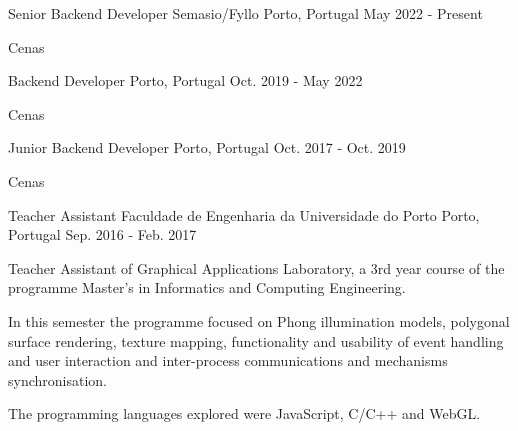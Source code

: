 \begin{cventries}
	\cventry
	{Senior Backend Developer} %
	{Semasio/Fyllo} %
	{Porto, Portugal} %
	{May 2022 - Present} %
	{
		\begin{cvitems} %
			\item {
				Cenas
			}
		\end{cvitems}
	}
	
	\cventry
	{Backend Developer} %
	{} %
	{Porto, Portugal} %
	{Oct. 2019 - May 2022} %
	{
		\begin{cvitems} %
			\item {
				Cenas
			}
		\end{cvitems}
	}
	
    \cventry
    {Junior Backend Developer} %
    {} %
    {Porto, Portugal} %
    {Oct. 2017 - Oct. 2019} %
    {
		\begin{cvitems} %
			\item {
				Cenas
			}
		\end{cvitems}
    }


   \cventry
    {Teacher Assistant} %
    {Faculdade de Engenharia da Universidade do Porto} %
    {Porto, Portugal} %
    {Sep. 2016 - Feb. 2017} %
    {
      \begin{cvitems} %
        \item {Teacher Assistant of Graphical Applications Laboratory, a 3rd year course of the programme Master's in Informatics and Computing Engineering.}
        \item{In this semester the programme focused on Phong illumination models, polygonal surface rendering, texture mapping, functionality and usability of event handling and user interaction and inter-process communications and mechanisms synchronisation.}
        \item{The programming languages explored were JavaScript, C/C++ and WebGL.}
      \end{cvitems}
    }


\end{cventries}
